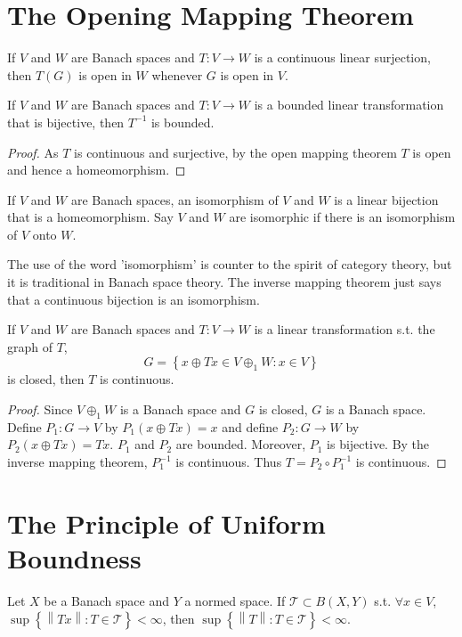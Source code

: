 \section{The Opening Mapping Theorem}
\begin{theorem}
    If $V$ and $W$ are Banach spaces and $T:V\to W$ is a continuous linear surjection,
    then $T(G)$ is open in $W$ whenever $G$ is open in $V$.
\end{theorem}


\begin{theorem}
    If $V$ and $W$ are Banach spaces and $T:V\to W$ is a bounded linear transformation that is bijective,
    then $T^{-1}$ is bounded.
\end{theorem}
\begin{proof}
    As $T$ is continuous and surjective, by the open mapping theorem $T$ is open and hence a homeomorphism.
\end{proof}

\begin{definition}
    If $V$ and $W$ are Banach spaces, an isomorphism of $V$ and $W$ is a linear bijection that is a homeomorphism.
    Say $V$ and $W$ are isomorphic if there is an isomorphism of $V$ onto $W$.
\end{definition}
\begin{remark}
    The use of the word 'isomorphism' is counter to the spirit of category theory, but it is traditional in Banach 
    space theory. The inverse mapping theorem just says that a continuous bijection is an isomorphism.
\end{remark}


\begin{theorem}
    If $V$ and $W$ are Banach spaces and $T:V\to W$ is a linear transformation s.t. the graph of $T$,
    \[ G=\left\{x\oplus Tx\in V\oplus_1 W: x\in V\right\}\] 
    is closed, then $T$ is continuous.
\end{theorem}
\begin{proof}
    Since $V\oplus_1 W$ is a Banach space and $G$ is closed, $G$ is a Banach space.
    Define $P_1:G\to V$ by $P_1(x\oplus Tx)=x$ and define $P_2:G\to W$ by $P_2(x\oplus Tx)=Tx$. 
    $P_1$ and $P_2$ are bounded. Moreover, $P_1$ is bijective. By the inverse mapping theorem, $P_1^{-1}$ is continuous. 
    Thus $T=P_2\circ P_1^{-1}$ is continuous.
\end{proof}


\section{The Principle of Uniform Boundness}
\begin{theorem}
    Let $X$ be a Banach space and $Y$ a normed space. If $\mathcal{T}\subset B(X,Y)$ s.t. $\forall x\in V$,
    $\sup\left\{\left\|Tx\right\|:T\in \mathcal{T}\right\}<\infty$, then $\sup\left\{\left\|T\right\|:T\in\mathcal{T}\right\}<\infty$.
\end{theorem}




